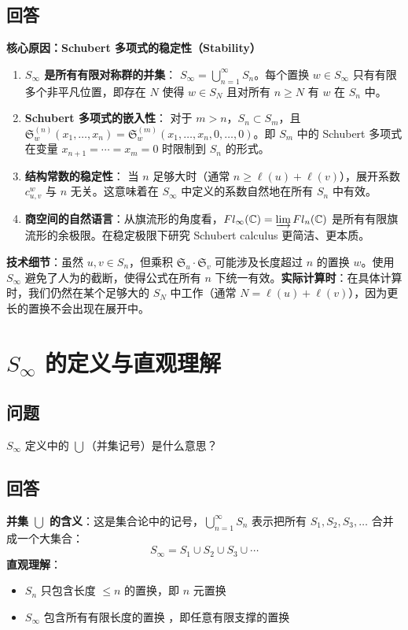 \subsection{回答}
\textbf{核心原因：Schubert 多项式的稳定性（Stability）}
\begin{enumerate}
\item \textbf{$S_\infty$ 是所有有限对称群的并集}：
$S_\infty = \bigcup_{n=1}^\infty S_n$。每个置换 $w \in S_\infty$ 只有有限多个非平凡位置，即存在 $N$ 使得 $w \in S_N$ 且对所有 $n \geq N$ 有 $w$ 在 $S_n$ 中。\item \textbf{Schubert 多项式的嵌入性}：
对于 $m > n$，$S_n \subset S_m$，且 $\mathfrak{S}_w^{(n)}(x_1, \ldots, x_n) = \mathfrak{S}_w^{(m)}(x_1, \ldots, x_n, 0, \ldots, 0)$。即 $S_m$ 中的 Schubert 多项式在变量 $x_{n+1} = \cdots = x_m = 0$ 时限制到 $S_n$ 的形式。\item \textbf{结构常数的稳定性}：
当 $n$ 足够大时（通常 $n \geq \ell(u) + \ell(v)$），展开系数 $c^w_{u,v}$ 与 $n$ 无关。这意味着在 $S_\infty$ 中定义的系数自然地在所有 $S_n$ 中有效。\item \textbf{商空间的自然语言}：从旗流形的角度看，$Fl_\infty(\mathbb{C}) = \varinjlim Fl_n(\mathbb{C})$ 是所有有限旗流形的余极限。在稳定极限下研究 Schubert  calculus 更简洁、更本质。
\end{enumerate}

\textbf{技术细节}：虽然 $u, v \in S_n$，但乘积 $\mathfrak{S}_u \cdot \mathfrak{S}_v$ 可能涉及长度超过 $n$ 的置换 $w$。使用 $S_\infty$ 避免了人为的截断，使得公式在所有 $n$ 下统一有效。\textbf{实际计算时}：在具体计算时，我们仍然在某个足够大的 $S_N$ 中工作（通常 $N = \ell(u) + \ell(v)$），因为更长的置换不会出现在展开中。
\section{$S_\infty$ 的定义与直观理解}\label{sec:SInfinity}
\subsection{问题}
$S_\infty$ 定义中的 $\bigcup$（并集记号）是什么意思？
\subsection{回答}
\textbf{并集 $\bigcup$ 的含义}：这是集合论中的记号，$\bigcup_{n=1}^\infty S_n$ 表示把所有 $S_1, S_2, S_3, \ldots$ 合并成一个大集合：$$S_\infty = S_1 \cup S_2 \cup S_3 \cup \cdots$$\textbf{直观理解}：
\begin{itemize}
\item $S_n$ 只包含长度
 $\leq n$ 的置换，即 $n$ 元置换\item $S_\infty$ 包含所有有限长度的置换
，即任意有限支撑的置换
\end{itemize}

